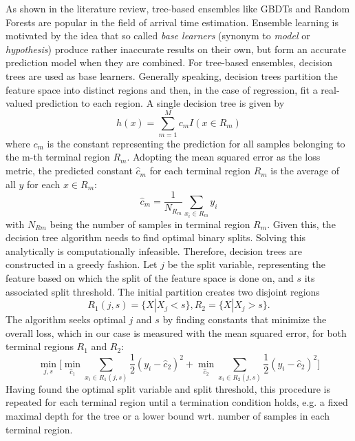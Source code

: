 As shown in the literature review, tree-based ensembles like GBDTs and Random Forests are popular in the field of arrival time estimation. Ensemble learning is motivated by the idea that so called \textit{base learners} (synonym to \textit{model} or \textit{hypothesis}) produce rather inaccurate results on their own, but form an accurate prediction model when they are combined. For tree-based ensembles, decision trees are used as base learners. 
Generally speaking, decision trees partition the feature space into distinct regions and then, in the case of regression, fit a real-valued prediction to each region. 
A single decision tree is given by
\begin{equation}
h(x) = \sum_{m=1}^{M} c_m I(x \in R_m)
\end{equation}
where $ c_m $ is the constant representing the prediction for all samples belonging to the m-th terminal region $ R_m $. Adopting the mean squared error as the loss metric, the predicted constant $ \hat{c}_m $ for each terminal region $ R_m $ is the average of all $ y $ for each $ x \in R_m $:
\begin{equation}
	\hat{c}_m =  \dfrac{1}{N_{R_m}}\sum_{x_i \in R_m}^{} y_i
\end{equation}
with $ N_{Rm} $ being the number of samples in terminal region $ R_m $. Given this, the decision tree algorithm needs to find optimal binary splits. Solving this analytically is computationally infeasible. Therefore, decision trees are constructed in a greedy fashion.
Let $ j $ be the split variable, representing the feature based on which the split of the feature space is done on, and $ s $ its associated split threshold.
The initial partition creates two disjoint regions
\begin{equation}
	R_1 (j,s) = \{X | X_j < s \}, R_{2} = \{X | X_j > s\}.
\end{equation}
The algorithm seeks optimal $ j $ and $ s $ by finding constants that minimize the overall loss, which in our case is measured with the mean squared error, for both terminal regions $ R_1 $ and $ R_2 $:
\begin{equation}\label{minjs}
	\min_{j,s} \bigg [\min_{\hat{c}_1} \sum_{x_i \in R_1(j,s)} \dfrac{1}{2}(y_i - \hat{c}_{2})^2 + \min_{\hat{c}_2} \sum_{x_i \in R_{2}(j,s)} \dfrac{1}{2}(y_i - \hat{c}_{2})^2\bigg]
\end{equation}
Having found the optimal split variable and split threshold, this procedure is repeated for each terminal region until a termination condition holds, e.g. a fixed maximal depth for the tree or a lower bound wrt. number of samples in each terminal region.
